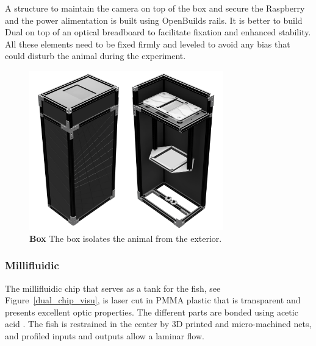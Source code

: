   A structure to maintain the camera on top of the box and secure the Raspberry and the power alimentation is built using OpenBuilds rails. It is better to build Dual on top of an optical breadboard to facilitate fixation and enhanced stability. All these elements need to be fixed firmly and leveled to avoid any bias that could disturb the animal during the experiment.

    \begin{figure}[h!]
      \centering
      \includegraphics[width=0.75\textwidth]{part_2/assets/box.png}
      \caption{\textbf{Box} The box isolates the animal from the exterior.}
      \label{dual_box}
    \end{figure}

  \subsubsection{Millifluidic}
  The millifluidic chip that serves as a tank for the fish, see Figure~\ref{dual_chip_visu}, is laser cut in PMMA plastic that is transparent and presents excellent optic properties. The different parts are bonded using acetic acid \cite{trinh2019clog}. The fish is restrained in the center by 3D printed and micro-machined nets, and profiled inputs and outputs allow a laminar flow.

